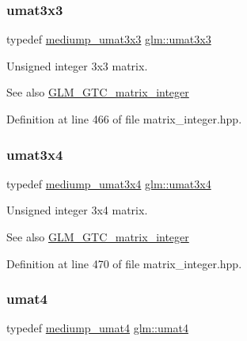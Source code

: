 \subsubsection{\texorpdfstring{umat3x3}{umat3x3}}
{\footnotesize\ttfamily typedef \mbox{\hyperlink{group__gtc__matrix__integer_gaa55f7815a399a780907a1dcd4caef7d9}{mediump\+\_\+umat3x3}} \mbox{\hyperlink{group__gtc__matrix__integer_gab80b6501ba1b2c40119a0f2d256f4c97}{glm\+::umat3x3}}}

Unsigned integer 3x3 matrix. \begin{DoxySeeAlso}{See also}
\mbox{\hyperlink{group__gtc__matrix__integer}{G\+L\+M\+\_\+\+G\+T\+C\+\_\+matrix\+\_\+integer}} 
\end{DoxySeeAlso}


Definition at line 466 of file matrix\+\_\+integer.\+hpp.

\mbox{\label{group__gtc__matrix__integer_ga5410857d098a989a30b4017100bc2ff7}} 
\subsubsection{\texorpdfstring{umat3x4}{umat3x4}}
{\footnotesize\ttfamily typedef \mbox{\hyperlink{group__gtc__matrix__integer_ga21a2361cc10822ad1a2297ac286c8e26}{mediump\+\_\+umat3x4}} \mbox{\hyperlink{group__gtc__matrix__integer_ga5410857d098a989a30b4017100bc2ff7}{glm\+::umat3x4}}}

Unsigned integer 3x4 matrix. \begin{DoxySeeAlso}{See also}
\mbox{\hyperlink{group__gtc__matrix__integer}{G\+L\+M\+\_\+\+G\+T\+C\+\_\+matrix\+\_\+integer}} 
\end{DoxySeeAlso}


Definition at line 470 of file matrix\+\_\+integer.\+hpp.

\mbox{\label{group__gtc__matrix__integer_ga7ae562000d8a8d193e9f93cf51e2e113}} 
\subsubsection{\texorpdfstring{umat4}{umat4}}
{\footnotesize\ttfamily typedef \mbox{\hyperlink{group__gtc__matrix__integer_ga3eb3a5d85ec876ba65fad5525a5dda56}{mediump\+\_\+umat4}} \mbox{\hyperlink{group__gtc__matrix__integer_ga7ae562000d8a8d193e9f93cf51e2e113}{glm\+::umat4}}}

